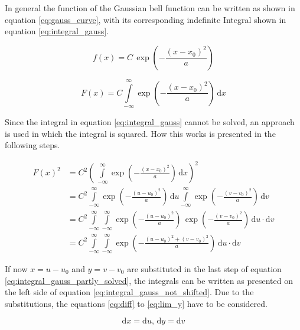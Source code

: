 In general the function of the Gaussian bell function can be written as shown in equation \ref{eq:gauss_curve}, with its corresponding indefinite Integral shown in equation \ref{eq:integral_gauss}.
\begin{center}
	\begin{equation} \label{eq:gauss_curve}
		f\left(x\right) = C \, \exp\left(-\frac{(x - x_0)^2}{a}\right)
	\end{equation}
\end{center}
\begin{center}
	\begin{equation} \label{eq:integral_gauss}
		F\left(x\right) = C \int\limits_{-\infty}^{\infty} \exp\left(-\frac{(x - x_0)^2}{a}\right)\,\mathrm{d}x
	\end{equation}
\end{center}
Since the integral in equation \ref{eq:integral_gauss} cannot be solved, an approach is used in which the integral is squared. How this works is presented in the following steps.
\begin{center}
	\begin{equation} \label{eq:integral_gauss_partly_solved}
		\begin{aligned}
		F\left(x\right)^2 &= C^2 \left( \, \int\limits_{-\infty}^{\infty} \exp\left(-\frac{(x - x_0)^2}{a}\right)\,\mathrm{d}x\right)^2 \\
		&= C^2 \int\limits_{-\infty}^{\infty} \exp\left(-\frac{(u - u_0)^2}{a}\right)\,\mathrm{d}u \int\limits_{-\infty}^{\infty} \exp\left(-\frac{(v - v_0)^2}{a}\right)\,\mathrm{d}v \\ 
		&= C^2 \int\limits_{-\infty}^{\infty} \int\limits_{-\infty}^{\infty} \exp\left(-\frac{(u - u_0)^2}{a}\right) \, \exp\left(-\frac{(v - v_0)^2}{a}\right) \,\mathrm{d}u \cdot \mathrm{d}v \\
		&= C^2 \int\limits_{-\infty}^{\infty} \int\limits_{-\infty}^{\infty} \exp\left(-\frac{(u - u_0)^2 + (v - v_0)^2}{a}\right) \,\mathrm{d}u \cdot \mathrm{d}v
		\end{aligned}
	\end{equation}
\end{center}
If now $x = u - u_0$ and $y = v - v_0$ are substituted in the last step of equation \ref{eq:integral_gauss_partly_solved}, the integrals can be written as presented on the left side of equation \ref{eq:integral_gauss_not_shifted}. Due to the substitutions, the equations \ref{eq:diff} to \ref{eq:lim_y} have to be considered. 
\begin{center}
	\begin{equation} \label{eq:diff}
		\mathrm{d}x = \mathrm{d}u \text{, } \mathrm{d}y = \mathrm{d}v
	\end{equation}
\end{center}
